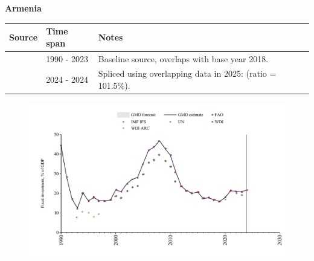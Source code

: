 \documentclass[12pt,a4paper,landscape]{article}
\begin{document}
\begin{adjustbox}{max totalsize={\paperwidth}{\paperheight},center}
\begin{minipage}[t][\textheight][t]{\textwidth}
\vspace*{0.5cm}
{}
\begin{center}
{\Large\bfseries Armenia}
\end{center}
\vspace{0.5cm}
\begin{table}[H]
\centering
\small
\begin{tabular}{|l|l|l|}
\hline
\textbf{Source} & \textbf{Time span} & \textbf{Notes} \\
\hline
\rowcolor{white}\cite{WDI}& 1990 - 2023 &Baseline source, overlaps with base year 2018.\\
\rowcolor{lightgray}\cite{IMF_IFS}& 2024 - 2024 &Spliced using overlapping data in 2025: (ratio = 101.5\%).\\
\hline
\end{tabular}
\end{table}
\begin{figure}[H]
\centering
\includegraphics[width=\textwidth,height=0.6\textheight,keepaspectratio]{graphs/ARM_finv_GDP.pdf}
\end{figure}
\end{minipage}
\end{adjustbox}
\end{document}
